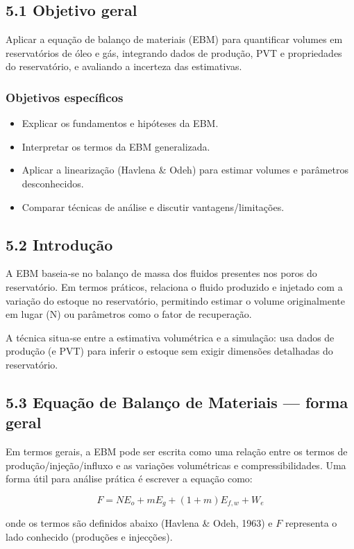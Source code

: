 \documentclass[11pt,a4paper]{article}
\begin{document}
\subsection{5.1 Objetivo geral}
Aplicar a equação de balanço de materiais (EBM) para quantificar volumes em reservatórios de óleo e gás, integrando dados de produção, PVT e propriedades do reservatório, e avaliando a incerteza das estimativas.

\subsubsection{Objetivos específicos}
\begin{itemize}
\item Explicar os fundamentos e hipóteses da EBM.
\item Interpretar os termos da EBM generalizada.
\item Aplicar a linearização (Havlena & Odeh) para estimar volumes e parâmetros desconhecidos.
\item Comparar técnicas de análise e discutir vantagens/limitações.
\end{itemize}

\subsection{5.2 Introdução}
A EBM baseia‑se no balanço de massa dos fluidos presentes nos poros do reservatório. Em termos práticos, relaciona o fluido produzido e injetado com a variação do estoque no reservatório, permitindo estimar o volume originalmente em lugar (N) ou parâmetros como o fator de recuperação.

A técnica situa‑se entre a estimativa volumétrica e a simulação: usa dados de produção (e PVT) para inferir o estoque sem exigir dimensões detalhadas do reservatório.

\subsection{5.3 Equação de Balanço de Materiais — forma geral}
Em termos gerais, a EBM pode ser escrita como uma relação entre os termos de produção/injeção/influxo e as variações volumétricas e compressibilidades. Uma forma útil para análise prática é escrever a equação como:

$$
F = N E_o + m E_g + (1+m) E_{f,w} + W_e
$$

onde os termos são definidos abaixo (Havlena \& Odeh, 1963) e $F$ representa o lado conhecido (produções e injecções).
\end{document}
